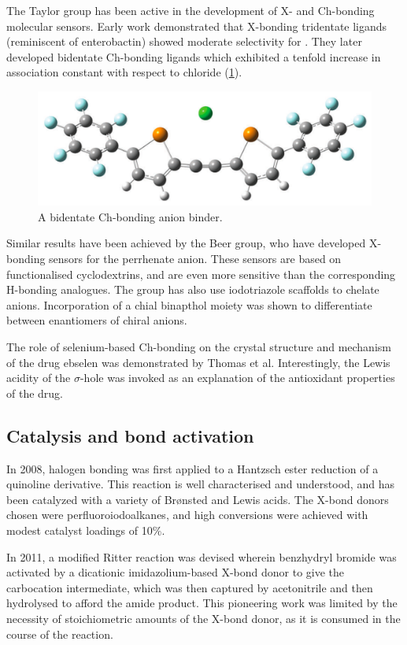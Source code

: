 \begin{refsection}
The Taylor group has been active in the development of X- and Ch-bonding molecular sensors.
Early work demonstrated that X-bonding tridentate ligands (reminiscent of enterobactin) showed moderate selectivity for .\autocite{Dimitrijevic2010}
They later developed bidentate Ch-bonding ligands which exhibited a tenfold increase in association constant with respect to chloride (\cref{fig:taylor-cl-binder}).\autocite{Garrett2015a,Garrett2016}

\begin{figure}
    \centering
    \includegraphics[width=0.6\linewidth]{Figures/taylor-cl-binder.pdf}
    \caption{A bidentate Ch-bonding anion binder.\autocite{Garrett2016}}
    \label{fig:taylor-cl-binder}
\end{figure}

Similar results have been achieved by the Beer group, who have developed X-bonding sensors for the perrhenate anion.\autocite{Cornes2017}
These sensors are based on functionalised cyclodextrins, and are even more sensitive than the corresponding H-bonding analogues.
The group has also use iodotriazole scaffolds to chelate anions.\autocite{Borissov2017}
Incorporation of a chial binapthol moiety was shown to differentiate between enantiomers of chiral anions.

The role of selenium-based Ch-bonding on the crystal structure and mechanism of the drug ebselen was demonstrated by Thomas et al.\autocite{Thomas2015}
Interestingly, the Lewis acidity of the $\sigma$-hole was invoked as an explanation of the antioxidant properties of the drug.

\subsection{Catalysis and bond activation}
In 2008, halogen bonding was first applied to a Hantzsch ester reduction of a quinoline derivative.\autocite{Bruckmann2008}
This reaction is well characterised and understood, and has been catalyzed with a variety of Br\o nsted and Lewis acids.
The X-bond donors chosen were perfluoroiodoalkanes, and high conversions were achieved with modest catalyst loadings of 10\%.

In 2011, a modified Ritter reaction was devised wherein benzhydryl bromide was activated by a dicationic imidazolium-based X-bond donor to give the carbocation intermediate, which was then captured by acetonitrile and then hydrolysed to afford the amide product.\autocite{Walter2011}
This pioneering work was limited by the necessity of stoichiometric amounts of the X-bond donor, as it is consumed in the course of the reaction.


\end{refsection}

